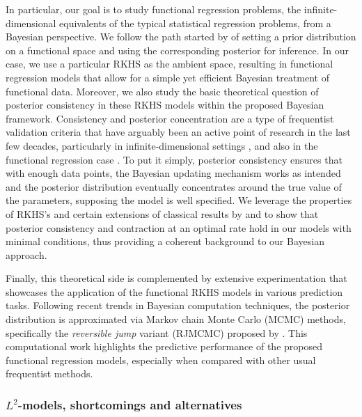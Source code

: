 \documentclass{article}
\numberwithin{equation}{section}
\theoremstyle{plain}
\theoremstyle{definition}
\begin{document}
In particular, our goal is to study functional regression problems, the infinite-dimensional equivalents of the typical statistical regression problems, from a Bayesian perspective. We follow the path started by \citet{ferguson1974prior} of setting a prior distribution on a functional space and using the corresponding posterior for inference. In our case, we use a particular RKHS as the ambient space, resulting in functional regression models that allow for a simple yet efficient Bayesian treatment of functional data. Moreover, we also study the basic theoretical question of posterior consistency in these RKHS models within the proposed Bayesian framework. Consistency and posterior concentration are a type of frequentist validation criteria that have arguably been an active point of research in the last few decades, particularly in infinite-dimensional settings \citep{amewou2003posterior, choi2008remarks}, and also in the functional regression case \citep{lian2016posterior,abraham2020posterior}. To put it simply, posterior consistency ensures that with enough data points, the Bayesian updating mechanism works as intended and the posterior distribution eventually concentrates around the true value of the parameters, supposing the model is well specified. We leverage the properties of RKHS's and certain extensions of classical results by \citet{doob1949application} and \citet{schwartz1965bayes} to show that posterior consistency and contraction at an optimal rate hold in our models with minimal conditions, thus providing a coherent background to our Bayesian approach.

Finally, this theoretical side is complemented by extensive experimentation that showcases the application of the functional RKHS models in various prediction tasks. Following recent trends in Bayesian computation techniques, the posterior distribution is approximated via Markov chain Monte Carlo (MCMC) methods, specifically the \textit{reversible jump} variant (RJMCMC) proposed by \citet{green1995reversible}. This computational work highlights the predictive performance of the proposed functional regression models, especially when compared with other usual frequentist methods.

\subsubsection*{\(L^2\)-models, shortcomings and alternatives}
\end{document}
